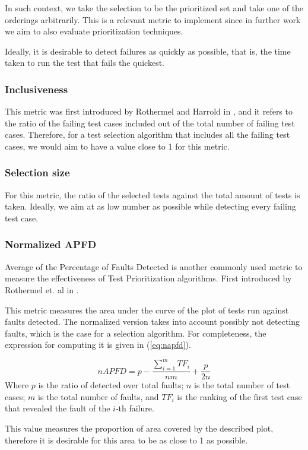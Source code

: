 \documentclass{article}
\begin{document}
In such context, we take the selection to be the prioritized set and take one of the orderings arbitrarily. This is a relevant metric to implement since in further work we aim to also evaluate prioritization techniques.

Ideally, it is desirable to detect failures as quickly as possible, that is, the time taken to run the test that fails the quickest.
\subsubsection{Inclusiveness}
This metric was first introduced by Rothermel and Harrold in \cite{Rothermel1997ASE}, and it refers to the ratio of the failing test cases included out of the total number of failing test cases. Therefore, for a test selection algorithm that includes all the failing test cases, we would aim to have a value close to 1 for this metric.
\subsubsection{Selection size}
For this metric, the ratio of the selected tests against the total amount of tests is taken. Ideally, we aim at as low number as possible while detecting every failing test case.
\subsubsection{Normalized APFD}
Average of the Percentage of Faults Detected is another commonly used metric to measure the effectiveness of Test Prioritization algorithms. First introduced by Rothermel et. al in \cite{962562}.

This metric measures the area under the curve of the plot of tests run against faults detected. The normalized version takes into account possibly not detecting faults, which is the case for a selection algorithm. For completeness, the expression for computing it is given in (\ref{eq:napfd}).

\begin{equation}
  \label{eq:napfd}
    nAPFD = p - \frac{\sum_{i=1}^{m}TF_i}{nm}+\frac{p}{2n}
\end{equation}
Where $p$ is the ratio of detected over total faults; $n$ is the total number of test cases; $m$ is the total number of faults, and $TF_i$ is the ranking of the first test case that revealed the fault of the $i$-th failure.

This value measures the proportion of area covered by the described plot, therefore it is desirable for this area to be as close to 1 as possible.
\end{document}
